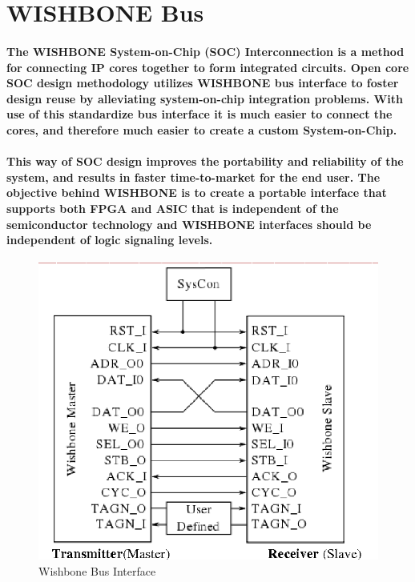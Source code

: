 \documentclass[12pt,a4paper]{report}
\begin{document}
\section{WISHBONE Bus}
\paragraph{\textrm{\textmd{The WISHBONE System-on-Chip (SOC) Interconnection is a method for	connecting IP cores together to form integrated circuits. Open core SOC design methodology utilizes WISHBONE bus interface to foster design reuse by alleviating	system-on-chip integration problems. With use of this standardize bus interface it is much easier to connect the cores, and therefore much easier to create a custom System-on-Chip.}}}
\paragraph{\textrm{\textmd{This way of SOC design improves the portability and reliability of the system, and results in faster time-to-market for the end user. The objective behind WISHBONE is to create a portable interface that supports both FPGA and ASIC that is independent of the 	semiconductor technology and WISHBONE interfaces should be independent of logic signaling levels.}}}
\begin{figure}[h]
	\centering
	\includegraphics[scale=.4]{interface.png}
	\caption{Wishbone Bus Interface}
	\label{fig:interface}
\end{figure} 		
\end{document}
